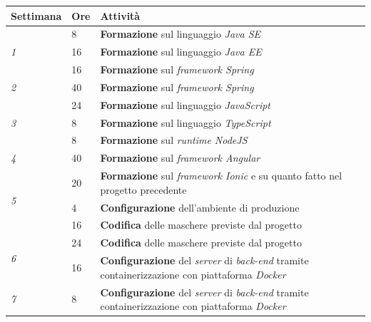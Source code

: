 \begin{table}[h]
  \label{tab:attivita-settimanali}
  \begin{tabularx}{\textwidth}{|l|l|X|}
  \hline
  \textbf{Settimana}          & \textbf{Ore} & \textbf{Attività}         \\ \hline
  \multirow{3}{*}{\textit{1}} & 8            & \textbf{Formazione} sul linguaggio \textit{Java SE}  \\ \cline{2-3}
                              & 16           & \textbf{Formazione} sul linguaggio \textit{Java EE}  \\ \cline{2-3}
                              & 16           & \textbf{Formazione} sul \textit{framework Spring}    \\ \hline
  \textit{2}                  & 40           & \textbf{Formazione} sul \textit{framework Spring}                    \\ \hline
  \multirow{3}{*}{\textit{3}} & 24           & \textbf{Formazione} sul linguaggio \textit{JavaScript}                        \\ \cline{2-3}
                              & 8            & \textbf{Formazione} sul linguaggio \textit{TypeScript}                        \\ \cline{2-3}
                              & 8            & \textbf{Formazione} sul \textit{runtime NodeJS}                     \\ \hline
  \textit{4}                  & 40           & \textbf{Formazione} sul \textit{framework Angular}                   \\ \hline
  \multirow{3}{*}{\textit{5}} & 20           & \textbf{Formazione} sul \textit{framework Ionic} e su quanto fatto nel progetto precedente \\ \cline{2-3}
                              & 4            & \textbf{Configurazione} dell'ambiente di produzione            \\ \cline{2-3}
                              & 16           & \textbf{Codifica} delle maschere previste dal progetto  \\ \hline
  \multirow{2}{*}{\textit{6}} & 24           & \textbf{Codifica} delle maschere previste dal progetto  \\ \cline{2-3}
                              & 16           & \textbf{Configurazione} del \textit{server} di \textit{back-end} tramite containerizzazione con piattaforma \textit{Docker}                   \\ \hline
  \textit{7}                  & 8            & \textbf{Configurazione} del \textit{server} di \textit{back-end} tramite containerizzazione con piattaforma \textit{Docker}           \\ \hline

\end{tabularx}
\end{table}
